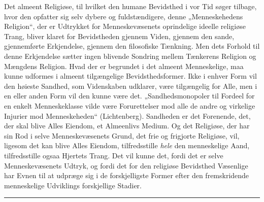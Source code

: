 \documentclass[12pt,a4paper,openany]{book}
\newcommand{\opage}[1]{\marginnote{\footnotesize\textit{[#1]}}}
\begin{document}
Det almeent Religiøse, til hvilket den humane Bevidsthed
i vor Tid søger tilbage, hvor den opfatter sig selv
dybere og fuldstændigere, denne „Menneskehedens Religion“,
der er Udtrykket for Menneskevæsenets oprindelige ideelle
religiøse Trang, bliver klaret for Bevidstheden gjennem Viden,
gjennem den sande, gjennemførte Erkjendelse, gjennem den
filosofiske Tænkning. Men dets Forhold til denne Erkjendelse
sætter ingen blivende Sondring mellem Tænkerens
Religion og Mængdens Religion. Hvad der er begrundet i
det almeent Menneskelige, maa kunne udformes i almeent
tilgængelige Bevidsthedsformer. Ikke i enhver Form vil den
høieste Sandhed, som Videnskaben udklarer, være tilgængelig
for Alle, men i en eller anden Form vil den kunne være
det. „Sandhedsmonopoler til Fordeel for en enkelt Menneskeklasse
vilde være Forurettelser mod alle de andre og virkelige
Injurier mod Menneskeheden“ (Lichtenberg). Sandheden
\opage{298}er det Forenende, det, der skal blive Alles Eiendom, et Almeenlivs
Medium. Og det Religiøse, der har sin Rod i
selve Menneskevæsenets Grund, det frie og frigjorte Religiøse,
vil, ligesom det kan blive Alles Eiendom, tilfredsstille
\emph{hele} den menneskelige Aand, tilfredsstille ogsaa Hjertets
Trang. Det vil kunne det, fordi det er selve Menneskevæsenets
Udtryk, og fordi det for den religiøse Bevidsthed
Væsenlige har Evnen til at udpræge sig i de forskjelligste
Former efter den fremskridende menneskelige Udviklings forskjellige
Stadier.

\begin{center}\rule{1.8cm}{0.4pt}\end{center}
\end{document}
